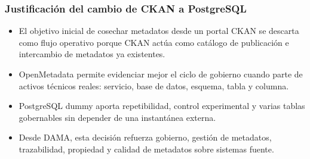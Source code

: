 \subsubsection{Justificación del cambio de CKAN a PostgreSQL}
\begin{itemize}
  \item El objetivo inicial de cosechar metadatos desde un portal CKAN se descarta como flujo operativo porque CKAN actúa como catálogo de publicación e intercambio de metadatos ya existentes.
  \item OpenMetadata permite evidenciar mejor el ciclo de gobierno cuando parte de activos técnicos reales: servicio, base de datos, esquema, tabla y columna.
  \item PostgreSQL dummy aporta repetibilidad, control experimental y varias tablas gobernables sin depender de una instantánea externa.
  \item Desde DAMA, esta decisión refuerza gobierno, gestión de metadatos, trazabilidad, propiedad y calidad de metadatos sobre sistemas fuente.
\end{itemize}
